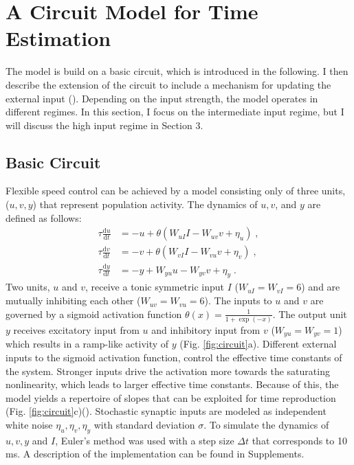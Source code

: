 \documentclass[10pt, a4paper]{article}
\begin{document}
\section{A Circuit Model for Time Estimation}
The model is build on a basic circuit, which is introduced in the following. I then describe the extension of the circuit to include a mechanism for updating the external input (\cite{Egger2020}).
Depending on the input strength, the model operates in different regimes. 
In this section, I focus on the intermediate input regime, but I will discuss the high input regime in Section 3.

\subsection{Basic Circuit}
Flexible speed control can be achieved by a model consisting only of three units, ($u, v, y$) that represent population activity.
The dynamics of $u, v$, and $y$ are defined as follows:
\begin{equation} \label{circuit}
	\begin{split}
	\tau\frac{\text{d}u}{\text{d}t} & = -u + \theta(W_{uI}I - W_{uv}v + \eta_u) \;, \\
	\tau\frac{\text{d}v}{\text{d}t} & = -v + \theta(W_{vI}I - W_{vu}v + \eta_v) \;, \\
	\tau\frac{\text{d}y}{\text{d}t} & = -y + W_{yu}u - W_{yv}v + \eta_y \;.
	\end{split}
\end{equation}
Two units, $u$ and $v$, receive a tonic symmetric input $I$ ($W_{uI}=W_{vI}=6$) and are mutually inhibiting each other ($W_{uv}=W_{vu}=6$). 
The inputs to $u$ and $v$ are governed by a sigmoid activation function $\theta(x) = \frac{1}{1+\exp(-x)}$.
The output unit $y$ receives excitatory input from $u$ and inhibitory input from $v$ ($W_{yu}=W_{yv}=1$) which results in a ramp-like activity of $y$ (Fig. \ref{fig:circuit}a).
Different external inputs to the sigmoid activation function, control the effective time constants of the system. Stronger inputs drive the activation more towards the saturating nonlinearity, which leads to larger effective time constants.
Because of this, the model yields a repertoire of slopes that can be exploited for time reproduction (Fig. \ref{fig:circuit}c)(\cite{Egger2020}). 
Stochastic synaptic inputs are modeled as independent white noise $\eta_u, \eta_v, \eta_y$ with standard deviation $\sigma$.
To simulate the dynamics of $u, v, y$ and $I$, Euler's method was used with a step size $\Delta t$ that corresponds to 10 ms. A description of the implementation can be found in Supplements.
\end{document}
